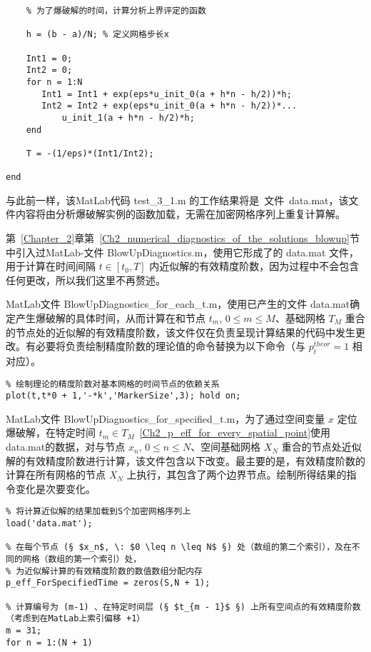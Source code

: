 \documentclass[twoside]{book}
\begin{document}
\begin{CJK*}{GBK}{song}
\begin{lstlisting}
    % 为了爆破解的时间，计算分析上界评定的函数

    h = (b - a)/N; % 定义网格步长x

    Int1 = 0;
    Int2 = 0;
    for n = 1:N
       Int1 = Int1 + exp(eps*u_init_0(a + h*n - h/2))*h;
       Int2 = Int2 + exp(eps*u_init_0(a + h*n - h/2))*...
           u_init_1(a + h*n - h/2)*h;
    end

    T = -(1/eps)*(Int1/Int2);

end
\end{lstlisting}

与此前一样，该MatLab代码 test\_3\_1.m 的工作结果将是~文件~data.mat，该文件内容将由分析爆破解实例的函数加载，无需在加密网格序列上重复计算解。

第~\ref{Chapter_2}章第~\ref{Ch2_numerical_diagnostics_of_the_solutions_blowup}节中引入过MatLab-文件 BlowUpDiagnostics.m，使用它形成了的 data.mat 文件，用于计算在时间间隔 $t \in [t_0,T]$ 内近似解的有效精度阶数，因为过程中不会包含任何更改，所以我们这里不再赘述。

MatLab文件 BlowUpDiagnostics\_for\_each\_t.m，使用已产生的文件 data.mat确定产生爆破解的具体时间，从而计算在和节点 $t_m$, $0 \leqslant m \leqslant M$、基础网格 $T_M$ 重合的节点处的近似解的有效精度阶数，该文件仅在负责呈现计算结果的代码中发生更改。有必要将负责绘制精度阶数的理论值的命令替换为以下命令（与 $p_t^{theor} = 1$ 相对应）。
%
\begin{lstlisting}
% 绘制理论的精度阶数对基本网格的时间节点的依赖关系
plot(t,t*0 + 1,'-*k','MarkerSize',3); hold on;
\end{lstlisting}

MatLab文件 BlowUpDiagnostics\_for\_specified\_t.m，为了通过空间变量 $x$ 定位爆破解，在特定时间 $t_m \in T_M$~\eqref{Ch2_p_eff_for_every_spatial_point}使用data.mat的数据，对与节点 $x_n$, $0 \leqslant n \leqslant N$、空间基础网格 $X_N$ 重合的节点处近似解的有效精度阶数进行计算，该文件包含以下改变。最主要的是，有效精度阶数的计算在所有网格的节点 $X_N$ 上执行，其包含了两个边界节点。绘制所得结果的指令变化是次要变化。
%
\begin{lstlisting}
% 将计算近似解的结果加载到S个加密网格序列上
load('data.mat');

% 在每个节点 (§ $x_n$, \: $0 \leq n \leq N$ §) 处（数组的第二个索引），及在不同的网格（数组的第一个索引）处，
% 为近似解计算的有效精度阶数的数值数组分配内存
p_eff_ForSpecifiedTime = zeros(S,N + 1);

% 计算编号为 (m-1) 、在特定时间层 (§ $t_{m - 1}$ §) 上所有空间点的有效精度阶数（考虑到在MatLab上索引偏移 +1）
m = 31;
for n = 1:(N + 1)


\end{lstlisting}
\end{CJK*}
\end{document}

